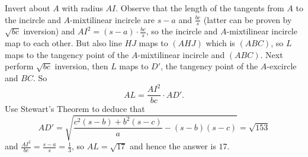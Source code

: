 Invert about $A$ with radius $AI$. Observe that the length of the tangents from $A$ to the incircle and $A$-mixtilinear incircle are $s-a$ and $\frac{bc}{s}$ (latter can be proven by $\sqrt{bc}$ inversion) and $AI^2=\left(s-a\right)\cdot\frac{bc}{s}$, so the incircle and $A$-mixtilinear incircle map to each other. But also line $HJ$ maps to $\left(AHJ\right)$ which is $\left(ABC\right)$, so $L$ maps to the tangency point of the $A$-mixtilinear incircle and $\left(ABC\right)$. Next perform $\sqrt{bc}$ inversion, then $L$ maps to $D'$, the tangency point of the $A$-excircle and $BC$. So \[AL=\frac{AI^2}{bc}\cdot AD'.\] Use Stewart's Theorem to deduce that \[AD'=\sqrt{\frac{c^2\left(s-b\right)+b^2\left(s-c\right)}{a}-\left(s-b\right)\left(s-c\right)}=\sqrt{153}\] and $\frac{AI^2}{bc}=\frac{s-a}{s}=\frac{1}{3}$, so $AL=\sqrt{17}$ and hence the answer is $\boxed{17}$.
